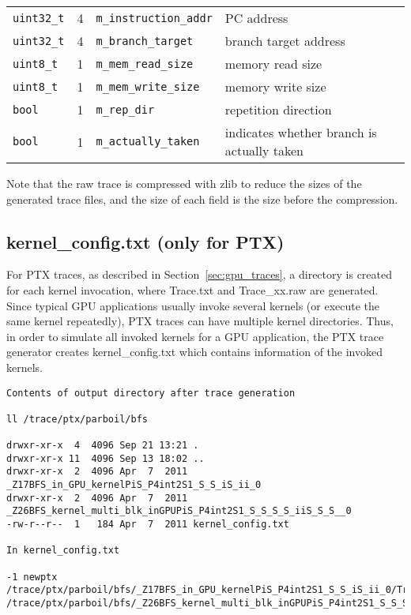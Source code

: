 \begin{footnotesize}
\begin{tabular}{l c l l}
\Verb+uint32_t+ & 4            & \Verb+m_instruction_addr+ & PC address                                             \\
\Verb+uint32_t+ & 4            & \Verb+m_branch_target+    & branch target address                                  \\
\Verb+uint8_t+  & 1            & \Verb+m_mem_read_size+    & memory read size                                       \\ 
\Verb+uint8_t+  & 1            & \Verb+m_mem_write_size+   & memory write size                                      \\
\Verb+bool+     & 1            & \Verb+m_rep_dir+          & repetition direction                                   \\
\Verb+bool+     & 1            & \Verb+m_actually_taken+   & indicates whether branch is actually taken             \\
\end{tabular}
\end{footnotesize}
\vspace{0.2in}


Note that the raw trace is compressed with zlib to reduce the sizes of
the generated trace files, and the size of each field is the size
before the compression.


\subsection{kernel\_config.txt (only for PTX)}
\label{sec:kern_config}

For PTX traces, as described in Section~\ref{sec:gpu_traces}, a directory is
created for each kernel invocation, where Trace.txt and Trace\_xx.raw are
generated. Since typical GPU applications usually invoke several kernels (or
execute the same kernel repeatedly), PTX traces can have multiple kernel
directories. Thus, in order to simulate all invoked kernels for a GPU
application, the PTX trace generator creates kernel\_config.txt which contains
information of the invoked kernels.


\begin{Verbatim}
Contents of output directory after trace generation

ll /trace/ptx/parboil/bfs

drwxr-xr-x  4  4096 Sep 21 13:21 .
drwxr-xr-x 11  4096 Sep 13 18:02 ..
drwxr-xr-x  2  4096 Apr  7  2011 _Z17BFS_in_GPU_kernelPiS_P4int2S1_S_S_iS_ii_0
drwxr-xr-x  2  4096 Apr  7  2011 _Z26BFS_kernel_multi_blk_inGPUPiS_P4int2S1_S_S_S_S_iiS_S_S__0
-rw-r--r--  1   184 Apr  7  2011 kernel_config.txt

In kernel_config.txt

-1 newptx
/trace/ptx/parboil/bfs/_Z17BFS_in_GPU_kernelPiS_P4int2S1_S_S_iS_ii_0/Trace.txt
/trace/ptx/parboil/bfs/_Z26BFS_kernel_multi_blk_inGPUPiS_P4int2S1_S_S_S_S_iiS_S_S__0/Trace.txt
\end{Verbatim}


